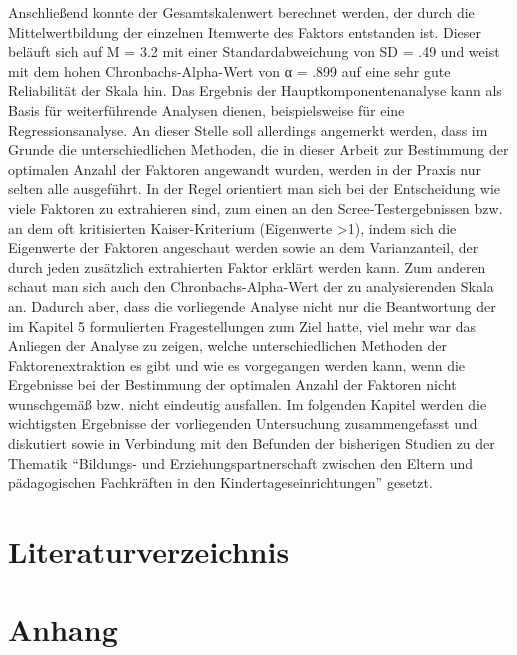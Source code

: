 \documentclass[12pt,a4paper]{article}
\begin{document}
	Anschließend konnte der Gesamtskalenwert berechnet werden, der durch die Mittelwertbildung der einzelnen Itemwerte des Faktors entstanden ist. Dieser beläuft sich auf  M = 3.2 mit einer Standardabweichung von SD = .49 und weist mit dem hohen Chronbachs-Alpha-Wert von α = .899 auf eine sehr gute Reliabilität der Skala hin. 
	Das Ergebnis der Hauptkomponentenanalyse kann als Basis für weiterführende Analysen dienen, beispielsweise für eine Regressionsanalyse. 
An dieser Stelle soll allerdings angemerkt werden, dass im Grunde die unterschiedlichen Methoden, die in dieser Arbeit zur Bestimmung der optimalen Anzahl der Faktoren angewandt wurden, werden in der Praxis nur selten alle ausgeführt. In der Regel orientiert man sich bei der Entscheidung wie viele Faktoren zu extrahieren sind, zum einen an den Scree-Testergebnissen bzw. an dem oft kritisierten Kaiser-Kriterium (Eigenwerte >1), indem sich die Eigenwerte der Faktoren angeschaut werden sowie an dem Varianzanteil, der durch jeden zusätzlich extrahierten Faktor erklärt werden kann. Zum anderen schaut man sich auch den Chronbachs-Alpha-Wert der zu analysierenden Skala an. Dadurch aber, dass die vorliegende Analyse nicht nur die Beantwortung der im Kapitel 5 formulierten Fragestellungen zum Ziel hatte, viel mehr war das Anliegen der Analyse zu zeigen, welche unterschiedlichen Methoden der Faktorenextraktion es gibt und wie es vorgegangen werden kann, wenn die Ergebnisse bei der Bestimmung der optimalen Anzahl der Faktoren nicht wunschgemäß bzw. nicht eindeutig ausfallen.
	Im folgenden Kapitel werden die wichtigsten Ergebnisse der vorliegenden Untersuchung zusammengefasst und diskutiert sowie in Verbindung mit den Befunden der bisherigen Studien zu der Thematik "`Bildungs- und Erziehungspartnerschaft zwischen den Eltern und pädagogischen Fachkräften in den Kindertageseinrichtungen"' gesetzt. 



 

\section*{Literaturverzeichnis}



\pagebreak

\begin{appendix}
\section*{Anhang}
\normalsize
\section{}
\end{appendix}
  
\end{document}
